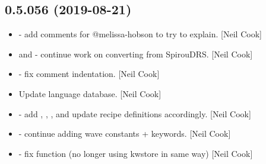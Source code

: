 \documentclass[a4paper,10pt,english]{report}
\begin{document}
\subsection{0.5.056 (2019-08-21)}
\label{\detokenize{misc/changelog:id87}}\begin{itemize}
\item {} 
 - add comments for @melissa-hobson to try to
explain. {[}Neil Cook{]}

\item {} 
 and  - continue work on
converting from SpirouDRS. {[}Neil Cook{]}

\item {} 
 - fix comment indentation. {[}Neil Cook{]}

\item {} 
Update language database. {[}Neil Cook{]}

\item {} 
 - add ,
, ,  and update recipe
definitions accordingly. {[}Neil Cook{]}

\item {} 
 - continue adding wave constants + keywords. {[}Neil
Cook{]}

\item {} 
 - fix  function (no longer using
kwstore in same way) {[}Neil Cook{]}

\end{itemize}
\end{document}
